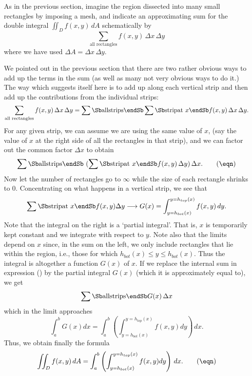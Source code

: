 As in the previous section, imagine the region dissected into
many small rectangles by imposing a mesh, and indicate an
approximating sum for the double integral $\displaystyle{
\iint_D f(x,y)\, dA}$ schematically by
$$
    \sum_{\text{all rectangles}} f(x,y) \,\Delta x\,\Delta y
$$
where we have used $\Delta A = \Delta x\,\Delta y$.
\medskip
\centerline{}
\medskip
We pointed out in the previous section that there are two rather
obvious ways to add up the terms in the sum (as well as many not
very obvious ways to do it.)  The way which suggests itself here
is to add up along each vertical strip and then add up the
contributions from the individual strips:
$$
    \sum_{\text{all rectangles}} f(x,y) \,\Delta x\,\Delta y
=\sum\Sb\text{all}\\ \text{strips}\endSb 
\sum\Sb\text{strip}\\ \text{at } x \endSb
f(x,y)\,\Delta x\,\Delta y.
$$
For any given strip, we can assume we are using the same value
of $x$, (say the value of $x$ at the right side of all the
rectangles in that strip), and we can factor out the common
factor $\Delta x$ to obtain
\nexteqn
$$
\sum\Sb\text{all}\\ \text{strips}\endSb\ %
(\sum\Sb\text{strip}\\ \text{at } x \endSb
f(x,y)\,\Delta y)\, \Delta x.\tag\eqn
$$
Now let the number of rectangles go to $\infty$
while the size of each rectangle shrinks to 0.  Concentrating
on what happens in a vertical strip, we see that
$$
    \sum\Sb\text{strip}\\ \text{at } x\endSb  f(x,y)\Delta y
       \longrightarrow  G(x) =  \int_{y = h_{bot}(x)}^{y = h_{top}(x)}
      f(x,y) \,dy.
$$
Note that the integral on the right is a
`partial integral'.  That is, $x$ is temporarily kept constant
and we integrate with respect to $y$.  Note also that the limits
depend on $x$ since, in the sum on the left, we only include rectangles
that lie within the region, i.e., those for which
$h_{bot}(x) \le y \le h_{bot}(x)$.   Thus the integral is altogether
a function $G(x)$ of $x$.   If we replace the internal sum in
expression (\eqn) by the partial integral $G(x)$ (which it is
approximately equal to), we get
$$
   \sum\Sb\text{all}\\ \text{strips}\endSb G(x)\, \Delta x 
$$
which in the limit approaches
$$
   \int_a^b G(x) dx = \int_a^b\left(\int_{y = h_{bot}(x)}^{y = h_{top}(x)}
    f(x,y) dy\right)\, dx.
$$
Thus, we obtain finally the formula
\nexteqn
\xdef\Fuby{\eqn}
$$
\iint_D f(x,y)\, dA =
\int_a^b\left(\int_{y = h_{bot}(x)}^{y = h_{top}(x)}
    f(x,y) dy\right)\, dx.\tag\eqn
$$
